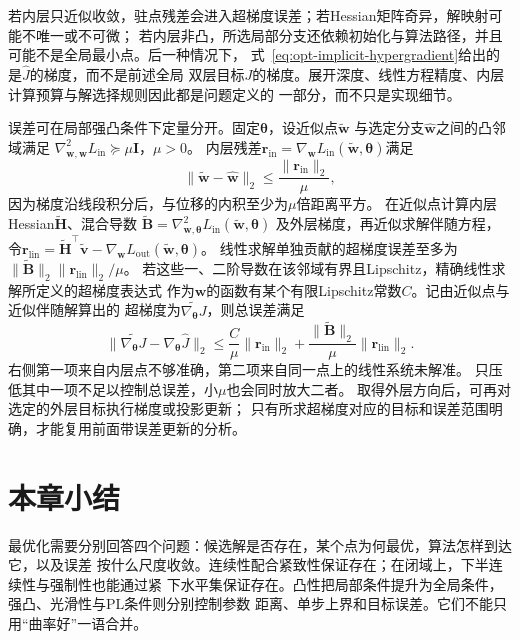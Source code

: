 若内层只近似收敛，驻点残差会进入超梯度误差；若Hessian矩阵奇异，解映射可能不唯一或不可微；
若内层非凸，所选局部分支还依赖初始化与算法路径，并且可能不是全局最小点。后一种情况下，
式~\eqref{eq:opt-implicit-hypergradient}给出的是$\widehat{J}$的梯度，而不是前述全局
双层目标$J$的梯度。展开深度、线性方程精度、内层计算预算与解选择规则因此都是问题定义的
一部分，而不只是实现细节。

误差可在局部强凸条件下定量分开。固定$\bm\theta$，设近似点$\widetilde{\bm w}$
与选定分支$\widehat{\bm w}$之间的凸邻域满足
$\nabla_{\bm w,\bm w}^2L_{\mathrm{in}}\succeq\mu\bm I$，$\mu>0$。
内层残差$\bm r_{\mathrm{in}}=\nabla_{\bm w}L_{\mathrm{in}}(\widetilde{\bm w},\bm\theta)$满足
\[
 \|\widetilde{\bm w}-\widehat{\bm w}\|_2
 \leq\frac{\|\bm r_{\mathrm{in}}\|_2}{\mu},
\]
因为梯度沿线段积分后，与位移的内积至少为$\mu$倍距离平方。
在近似点计算内层Hessian$\widetilde{\bm H}$、混合导数
$\widetilde{\bm B}=\nabla_{\bm w,\bm\theta}^2L_{\mathrm{in}}(\widetilde{\bm w},\bm\theta)$
及外层梯度，再近似求解伴随方程，
令$\bm r_{\mathrm{lin}}=\widetilde{\bm H}^{\top}\widetilde{\bm v}
-\nabla_{\bm w}L_{\mathrm{out}}(\widetilde{\bm w},\bm\theta)$。
线性求解单独贡献的超梯度误差至多为
$\|\widetilde{\bm B}\|_2\|\bm r_{\mathrm{lin}}\|_2/\mu$。
若这些一、二阶导数在该邻域有界且Lipschitz，精确线性求解所定义的超梯度表达式
作为$\bm w$的函数有某个有限Lipschitz常数$C$。记由近似点与近似伴随解算出的
超梯度为$\widetilde{\nabla_{\bm\theta}J}$，则总误差满足
\begin{equation}
 \|\widetilde{\nabla_{\bm\theta} J}-\nabla_{\bm\theta}\widehat J\|_2
 \leq\frac C\mu\|\bm r_{\mathrm{in}}\|_2
 +\frac{\|\widetilde{\bm B}\|_2}{\mu}\|\bm r_{\mathrm{lin}}\|_2.
 \label{eq:opt-hypergradient-two-residuals}
\end{equation}
右侧第一项来自内层点不够准确，第二项来自同一点上的线性系统未解准。
只压低其中一项不足以控制总误差，小$\mu$也会同时放大二者。
取得外层方向后，可再对选定的外层目标执行梯度或投影更新；
只有所求超梯度对应的目标和误差范围明确，才能复用前面带误差更新的分析。

\section{本章小结}
\label{sec:opt-summary}

最优化需要分别回答四个问题：候选解是否存在，某个点为何最优，算法怎样到达它，以及误差
按什么尺度收敛。连续性配合紧致性保证存在；在闭域上，下半连续性与强制性也能通过紧
下水平集保证存在。凸性把局部条件提升为全局条件，强凸、光滑性与PL条件则分别控制参数
距离、单步上界和目标误差。它们不能只用“曲率好”一语合并。

